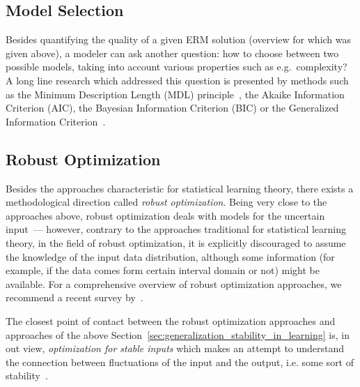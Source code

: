 \subsection{Model Selection}
Besides quantifying the quality of a given ERM solution (overview for which was
given above), a modeler can ask another question: how to choose between two
possible models, taking into account various properties such as e.g.~complexity?
A long line research which addressed this question is presented by methods such
as the Minimum Description Length (MDL) principle~\citep{Rissanen:1978}, the
Akaike Information Criterion (AIC), the Bayesian Information Criterion (BIC) or
the Generalized Information Criterion~\citep[for an overview,
see][]{Konishi:2007}.

\subsection{Robust Optimization}

Besides the approaches characteristic for statistical learning theory, there
exists a methodological direction called \textit{robust optimization}.
%
Being very close to the approaches above, robust optimization deals with models
for the uncertain input~--- however, contrary to the approaches traditional for
statistical learning theory, in the field of robust optimization, it is
explicitly discouraged to assume the knowledge of the input data distribution,
although some information (for example, if the data comes form certain interval
domain or not) might be available.
%
For a comprehensive overview of robust optimization approaches, we recommend a
recent survey by~\citet{series/lncs/GoerigkS16}.

The closest point of contact between the robust optimization approaches and
approaches of the above Section~\ref{sec:generalization_stability_in_learning}
is, in out view, \textit{optimization for stable inputs} which makes an attempt
to understand the connection between fluctuations of the input and the output,
i.e. some sort of stability~\citep{journals/cpc/BiluL12,%
conf/sirocco/BiloGGPW09,journals/scheduling/GattoW11,conf/sofsem/MihalakSSW11}.




